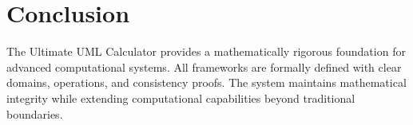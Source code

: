 \documentclass[12pt,a4paper]{article}
\begin{document}
\section{Conclusion}

The Ultimate UML Calculator provides a mathematically rigorous foundation for advanced computational systems. All frameworks are formally defined with clear domains, operations, and consistency proofs. The system maintains mathematical integrity while extending computational capabilities beyond traditional boundaries.
\end{document}
